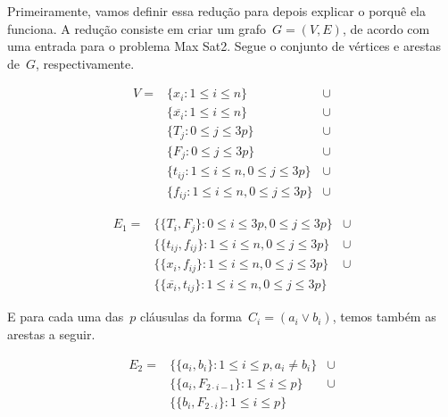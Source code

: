 \documentclass[a4paper,12pt]{article}
\begin{document}
		Primeiramente, vamos definir essa redução para depois
		explicar o porquê ela funciona.
		A redução consiste em criar um grafo~$G=(V,E)$, de 
		acordo com uma entrada para o problema Max Sat2.
		Segue o conjunto de vértices e arestas de~$G$, 
		respectivamente.
		
		\begin{align}
			V = &\{x_i: 1\le i\le n\} &\cup \nonumber\\
				&\{\overline{x_i}: 1\le i\le n\} &\cup\nonumber\\ 
				&\{T_j: 0\le j\le 3p\} &\cup \nonumber\\
				&\{F_j: 0\le j\le 3p\} &\cup \nonumber\\
				&\{t_{ij}: 1\le i\le n, 0\le j\le 3p\} 
					&\cup \nonumber\\
				&\{f_{ij}: 1\le i\le n, 0\le j\le 3p\} 
					&\cup \nonumber
		\end{align}

		\begin{align}
			E_1=&\{ \{T_i,F_j\}: 0\le i\le 3p, 0\le j\le 3p\} &\cup 
					\nonumber\\
				&\{\{t_{ij}, f_{ij}\}: 1\le i\le n, 
					0\le j\le 3p\} &\cup \nonumber \\
				&\{\{x_i, f_{ij}\}: 1\le i\le n, 
					0\le j\le 3p\} &\cup \nonumber \\
				&\{\{\overline{x_i}, t_{ij}\}: 1\le 
					i\le n, 0\le j\le 3p\} \nonumber
		\end{align}


		E para cada uma das~$p$ cláusulas da forma~$C_i=(a_i\lor b_i)$, 
		temos também as arestas a seguir.

		\begin{align}
			E_2=&\{ \{a_i,b_i\}: 1\le i\le p, a_i\ne b_i \} &\cup 
					\nonumber\\
				&\{\{a_i, F_{2\cdot i-1}\}: 1\le i\le p\} &\cup \nonumber \\
				&\{\{b_i, F_{2\cdot i}\}: 1\le i\le p\} \nonumber
		\end{align}
\end{document}
